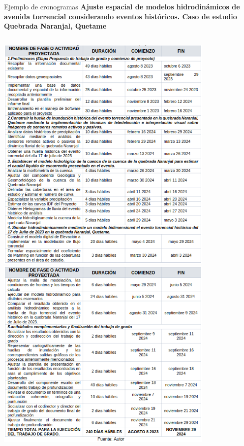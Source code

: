 \documentclass[
10pt,
aspectratio=169,
]{beamer}
\begin{document}
\begin{frame}{Ejemplo de cronogramas}
\textbf{Ajuste espacial de modelos hidrodinámicos de avenida torrencial considerando eventos históricos. Caso de estudio Quebrada Naranjal, Quetame} 
\begin{columns}
\centering
\includegraphics[width=0.8\textwidth]{f2prog.png}
\centering
\includegraphics[width=0.8\textwidth]{f3prog.png}
\end{columns}
\end{frame}
\end{document}
